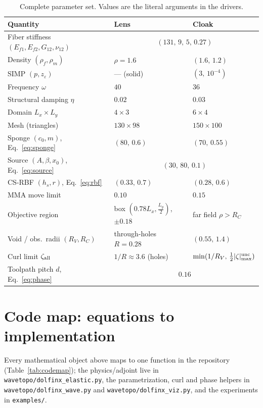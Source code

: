 \documentclass[11pt]{article}
\begin{document}
\begin{table}[h]
\centering
\small
\begin{tabular}{@{}lll@{}}
\toprule
Quantity & Lens & Cloak \\
\midrule
Fiber stiffness $(E_{f1},E_{f2},G_{12},\nu_{12})$ & \multicolumn{2}{c}{$(131,\,9,\,5,\,0.27)$} \\
Density $(\rho_f,\rho_m)$ & $\rho=1.6$ & $(1.6,\,1.2)$ \\
SIMP $(p,z_\varepsilon)$ & --- (solid) & $(3,\,10^{-4})$ \\
Frequency $\omega$ & $40$ & $36$ \\
Structural damping $\eta$ & $0.02$ & $0.03$ \\
Domain $L_x\times L_y$ & $4\times3$ & $6\times4$ \\
Mesh (triangles) & $130\times98$ & $150\times100$ \\
Sponge $(c_0,m)$, Eq.~\eqref{eq:sponge} & $(80,\,0.6)$ & $(70,\,0.55)$ \\
Source $(A,\beta,x_0)$, Eq.~\eqref{eq:source} & \multicolumn{2}{c}{$(30,\,80,\,0.1)$} \\
CS-RBF $(h_s,r)$, Eq.~\eqref{eq:rbf} & $(0.33,\,0.7)$ & $(0.28,\,0.6)$ \\
MMA move limit & $0.10$ & $0.15$ \\
Objective region & box $(0.78L_x,\tfrac{L_y}{2})$, $\pm0.18$ & far field $\rho>R_C$ \\
Void / obs.\ radii $(R_V,R_C)$ & through-holes $R=0.28$ & $(0.55,\,1.4)$ \\
Curl limit $\zeta_{\rm all}$ & $1/R\!\approx\!3.6$ (holes) & $\min(1/R_V,\,\tfrac12|\zeta|^{\rm unc}_{\max})$ \\
Toolpath pitch $d$, Eq.~\eqref{eq:phase} & \multicolumn{2}{c}{$0.16$} \\
\bottomrule
\end{tabular}
\caption{Complete parameter set. Values are the literal arguments in the drivers.}
\label{tab:params}
\end{table}

\section{Code map: equations to implementation}
\label{app:codemap}
Every mathematical object above maps to one function in the repository
(Table~\ref{tab:codemap}); the physics/adjoint live in
\texttt{wavetopo/dolfinx\_elastic.py}, the parametrization, curl and phase helpers
in \texttt{wavetopo/dolfinx\_wave.py} and \texttt{wavetopo/dolfinx\_viz.py}, and the
experiments in \texttt{examples/}.
\end{document}
